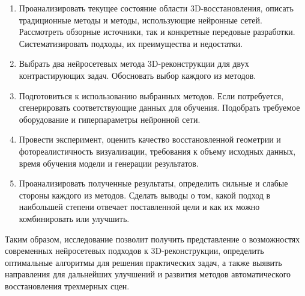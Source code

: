 \begin{enumerate}
	\item Проанализировать текущее состояние области 3D-восстановления, описать
	традиционные методы и методы, использующие нейронные сетей.  Рассмотреть
	обзорные источники, так и конкретные передовые разработки. Систематизировать
	подходы, их преимущества и недостатки.
	\item Выбрать два нейросетевых метода 3D-реконструкции для двух
	контрастирующих задач.  Обосновать выбор каждого из методов.
	\item Подготовиться к использованию выбранных методов. Если потребуется,
	сгенерировать соответствующие данных для обучения. Подобрать требуемое
	оборудование и гиперпараметры нейронной сети.
	\item Провести эксперимент, оценить качество восстановленной геометрии и
	фотореалистичность визуализации, требования к объему исходных данных, время
	обучения модели и генерации результатов.
	\item Проанализировать полученные
	результаты, определить сильные и слабые стороны каждого из методов. Сделать
	выводы о том, какой подход в наибольшей степени отвечает поставленной цели и
	как их можно комбинировать или улучшить.
\end{enumerate}

Таким образом, исследование позволит получить представление о
возможностях современных нейросетевых подходов к 3D-реконструкции, определить
оптимальные алгоритмы для решения практических задач, а также выявить
направления для дальнейших улучшений и развития методов автоматического
восстановления трехмерных сцен.
